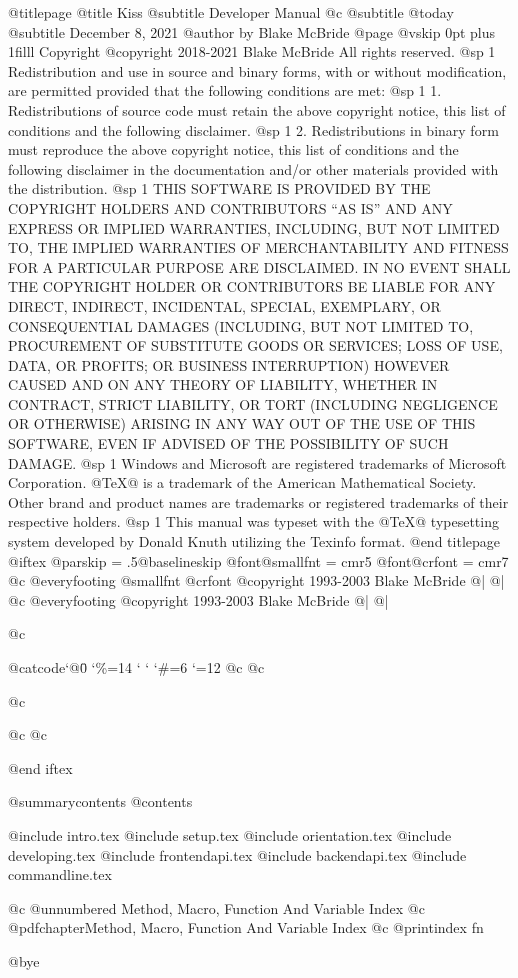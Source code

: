 @titlepage
@title Kiss
@subtitle Developer Manual
@c @subtitle @today{}
@subtitle December 8, 2021
@author by Blake McBride
@page
@vskip 0pt plus 1filll
Copyright  @copyright{} 2018-2021 Blake McBride
All rights reserved.
@sp 1
Redistribution and use in source and binary forms, with or without
modification, are permitted provided that the following conditions are
met:
@sp 1
1. Redistributions of source code must retain the above copyright
notice, this list of conditions and the following disclaimer.
@sp 1
2. Redistributions in binary form must reproduce the above copyright
notice, this list of conditions and the following disclaimer in the
documentation and/or other materials provided with the distribution.
@sp 1
THIS SOFTWARE IS PROVIDED BY THE COPYRIGHT HOLDERS AND CONTRIBUTORS
``AS IS'' AND ANY EXPRESS OR IMPLIED WARRANTIES, INCLUDING, BUT NOT
LIMITED TO, THE IMPLIED WARRANTIES OF MERCHANTABILITY AND FITNESS FOR
A PARTICULAR PURPOSE ARE DISCLAIMED. IN NO EVENT SHALL THE COPYRIGHT
HOLDER OR CONTRIBUTORS BE LIABLE FOR ANY DIRECT, INDIRECT, INCIDENTAL,
SPECIAL, EXEMPLARY, OR CONSEQUENTIAL DAMAGES (INCLUDING, BUT NOT
LIMITED TO, PROCUREMENT OF SUBSTITUTE GOODS OR SERVICES; LOSS OF USE,
DATA, OR PROFITS; OR BUSINESS INTERRUPTION) HOWEVER CAUSED AND ON ANY
THEORY OF LIABILITY, WHETHER IN CONTRACT, STRICT LIABILITY, OR TORT
(INCLUDING NEGLIGENCE OR OTHERWISE) ARISING IN ANY WAY OUT OF THE USE
OF THIS SOFTWARE, EVEN IF ADVISED OF THE POSSIBILITY OF SUCH DAMAGE.
@sp 1
Windows and Microsoft are registered trademarks of
Microsoft Corporation.  @TeX{}@ is a trademark of the American
Mathematical Society. Other brand and product names are trademarks or
registered trademarks of their respective holders.
@sp 1
This manual was typeset with the @TeX{}@ typesetting system developed by
Donald Knuth utilizing the Texinfo format.
@end titlepage
@iftex
@parskip = .5@baselineskip
@font@smallfnt = cmr5
@font@crfont = cmr7
@c @everyfooting {@smallfnt {@crfont @copyright{}} 1993-2003 Blake McBride} @| @|
@c @everyfooting { @copyright{} 1993-2003 Blake McBride} @| @|


@c {@catcode`@\=0 \catcode`\%=14 \catcode` \catcode` \catcode `\#=6 \catcode `\@=12
@c 
@c 
@c 
@c %
@c }

@end iftex

@summarycontents
@contents

@include intro.tex
@include setup.tex
@include orientation.tex
@include developing.tex
@include frontendapi.tex
@include backendapi.tex
@include commandline.tex


@c @unnumbered Method, Macro, Function And Variable Index
@c @pdfchapter{Method, Macro, Function And Variable Index}
@c @printindex fn

@bye

